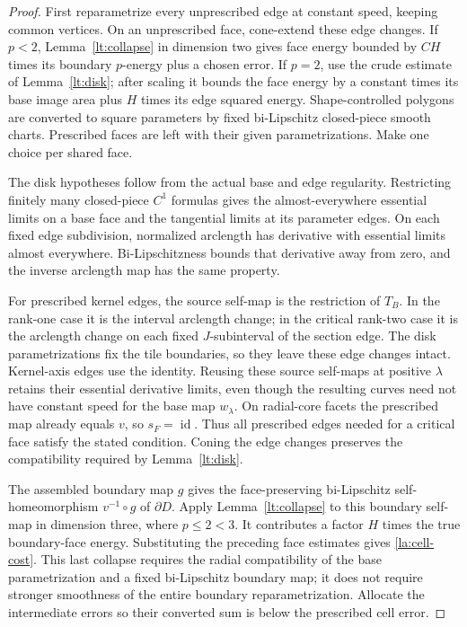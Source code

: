 \documentclass[11pt]{article}
\numberwithin{equation}{section}
\theoremstyle{definition}
\theoremstyle{remark}
\newcommand{\Id}{\operatorname{id}}
\begin{document}
\begin{proof}
First reparametrize every unprescribed edge at constant speed,
keeping common vertices.  On an unprescribed face, cone-extend these
edge changes.  If $p<2$, Lemma~\ref{lt:collapse} in dimension two gives
face energy bounded by $CH$ times its boundary $p$-energy plus a
chosen error.  If $p=2$, use the crude estimate of
Lemma~\ref{lt:disk}; after scaling it bounds the face energy by a
constant times its base image area plus $H$ times its edge squared
energy.  Shape-controlled polygons are converted to square
parameters by fixed bi-Lipschitz closed-piece smooth charts.
Prescribed faces are left with their given parametrizations.  Make
one choice per shared face.

The disk hypotheses follow from the actual base and edge regularity.
Restricting finitely many closed-piece $C^1$ formulas gives the
almost-everywhere essential limits on a base face and the tangential
limits at its parameter edges.  On each fixed edge subdivision,
normalized arclength has derivative with essential limits almost
everywhere.  Bi-Lipschitzness bounds that derivative away from zero,
and the inverse arclength map has the same property.

For prescribed kernel edges, the source self-map is the restriction
of $T_B$.  In the rank-one case it is the interval arclength change;
in the critical rank-two case it is the arclength change on each fixed
$J$-subinterval of the section edge.  The disk parametrizations fix the
tile boundaries, so they leave these edge changes intact.  Kernel-axis
edges use the identity.  Reusing these source self-maps at positive
$\lambda$ retains their essential derivative limits, even though the
resulting curves need not have constant speed for the base map
$w_\lambda$.  On radial-core facets the prescribed map already equals
$v$, so $s_F=\Id$.  Thus all prescribed edges needed for a critical
face satisfy the stated condition.  Coning the edge changes preserves the
compatibility required by Lemma~\ref{lt:disk}.

The assembled boundary map $g$ gives the face-preserving bi-Lipschitz
self-homeomorphism $v^{-1}\circ g$ of $\partial D$.  Apply
Lemma~\ref{lt:collapse} to this boundary self-map in dimension three,
where $p\le2<3$.
It contributes a factor $H$ times the true boundary-face energy.
Substituting the preceding face estimates gives
\eqref{la:cell-cost}.  This last collapse requires the radial
compatibility of the base parametrization and a fixed bi-Lipschitz
boundary map; it does not require stronger smoothness of the entire
boundary reparametrization.  Allocate the intermediate errors so
their converted sum is below the prescribed cell error.
\end{proof}
\end{document}
